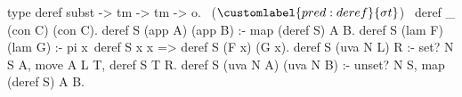   type deref subst -> tm -> tm -> o.                   ~($\customlabel{pred:deref}{\sigma t}$)~
  deref _ (con C) (con C).
  deref S (app A) (app B) :- map (deref S) A B.
  deref S (lam F) (lam G) :-
    pi x\ deref S x x => deref S (F x) (G x).
  deref S (uva N L) R :- set? N S A,
    move A L T, deref S T R.
  deref S (uva N A) (uva N B) :- unset? N S,
    map (deref S) A B.
